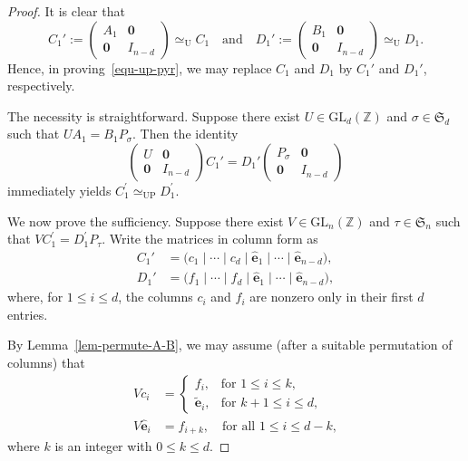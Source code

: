 \documentclass[10pt,a4paper]{amsart}
\begin{document}
\begin{proof}
It is clear that
\[
C_1' := \begin{pmatrix}
A_1 & \mathbf{0} \\
\mathbf{0} & I_{n-d}
\end{pmatrix} \simeq_{\mathrm{U}} C_1
\quad \text{and} \quad
D_1' := \begin{pmatrix}
B_1 & \mathbf{0} \\
\mathbf{0} & I_{n-d}
\end{pmatrix} \simeq_{\mathrm{U}} D_1.
\]
Hence, in proving~\eqref{equ-up-pyr}, we may replace $C_1$ and $D_1$ by $C_1'$ and $D_1'$, respectively.

The necessity is straightforward. Suppose there exist $U \in \mathrm{GL}_{d}(\mathbb{Z})$ and $\sigma \in \mathfrak{S}_d$ such that $UA_1 = B_1P_\sigma$. Then the identity
\[
\begin{pmatrix}
U & \mathbf{0} \\
\mathbf{0} & I_{n-d}
\end{pmatrix}
C_1' =
D_1'
\begin{pmatrix}
P_\sigma & \mathbf{0} \\
\mathbf{0} & I_{n-d}
\end{pmatrix}
\]
immediately yields $C_1^{\prime} \simeq_{\mathrm{UP}} D_1^{\prime}$.

We now prove the sufficiency. Suppose there exist $V \in \mathrm{GL}_{n}(\mathbb{Z})$ and $\tau \in \mathfrak{S}_n$ such that $VC_1^{\prime} = D_1^{\prime}P_\tau$. Write the matrices in column form as
\begin{align*}
C_1' &= \big( c_1 \mid \cdots \mid c_{d} \mid \widehat{\mathbf{e}}_1 \mid \cdots \mid \widehat{\mathbf{e}}_{n-d} \big), \\
D_1' &= \big( f_1 \mid \cdots \mid f_{d} \mid \widehat{\mathbf{e}}_1 \mid \cdots \mid \widehat{\mathbf{e}}_{n-d} \big),
\end{align*}
where, for $1 \le i \le d$, the columns $c_i$ and $f_i$ are nonzero only in their first $d$ entries.

By Lemma~\ref{lem-permute-A-B}, we may assume (after a suitable permutation of columns) that
\begin{align}
V c_i &=
\begin{cases}
f_i, & \text{for } 1 \le i \le k, \\
\widetilde{\mathbf{e}}_{i}, & \text{for } k+1 \le i \le d,
\end{cases}
\label{eq:combined1} \\
V \widehat{\mathbf{e}}_i &= f_{i+k}, \quad \text{for all } 1 \le i \le d-k, \label{eq:combined2}
\end{align}
where $k$ is an integer with $0 \le k \le d$.



\end{proof}
\end{document}
